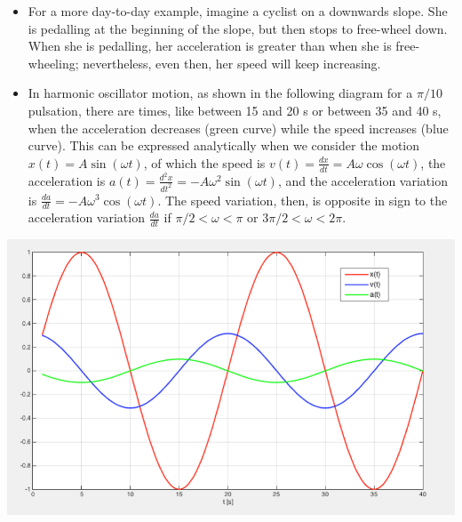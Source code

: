\begin{enumerate}
\begin{itemize}
\item For a more day-to-day example, imagine a cyclist on a downwards slope. She is pedalling at the beginning of the slope, but then stops to free-wheel down. When she is pedalling, her acceleration is greater than when she is free-wheeling; nevertheless, even then, her speed will keep increasing.
\item In harmonic oscillator motion, as shown in the following diagram for a $\pi/10$ pulsation, there are times, like between 15 and 20 s or between 35 and 40 s, when the acceleration decreases (green curve) while the speed increases (blue curve). This can be expressed analytically when we consider the motion $x(t)=A\sin(\omega t)$, of which the speed is $v(t)=\frac{dx}{dt}=A\omega\cos(\omega t)$, the acceleration is $a(t)=\frac{d^2x}{dt^2}=-A\omega^2\sin(\omega t)$, and the acceleration variation is $\frac{da}{dt}=-A\omega^3\cos(\omega t)$. The speed variation, then, is opposite in sign to the acceleration variation  $\frac{da}{dt}$ if $\pi/2<\omega <\pi$ or $3\pi/2<\omega<2\pi$.
\end{itemize}
\end{enumerate}
\begin{center}
\includegraphics[width=.8\textwidth]{figures/serie02_concept.pdf}
\end{center}
